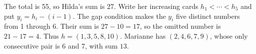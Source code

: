 The total is 55, so Hilda's sum is 27. Write her increasing cards $h_1<\cdots<h_5$ and put $y_i=h_i-(i-1)$. The gap condition makes the $y_i$ five distinct numbers from 1 through 6. Their sum is $27-10=17$, so the omitted number is $21-17=4$. Thus $h=(1,3,5,8,10)$. Marianne has $(2,4,6,7,9)$, whose only consecutive pair is 6 and 7, with sum $\boxed{13}$.
